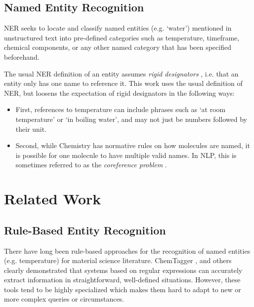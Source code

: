 \subsection{Named Entity Recognition}\label{sub:NER}
\gls{NER} seeks to locate and classify named entities (e.g. `water') mentioned in unstructured text into pre-defined categories \cite{li_survey_2022} such as temperature, timeframe, chemical components, or any other named category that has been specified beforehand.

The usual \gls{NER} definition of an entity assumes \textit{rigid designators} \cite{laporte_rigid_2022}, i.e. that an entity only has one name to reference it.
This work uses the usual definition of \gls{NER}, but loosens the expectation of rigid designators in the following ways:

\begin{itemize}
    \item First, references to temperature can include phrases such as `at room temperature' or `in boiling water', and may not just be numbers followed by their unit.
    \item Second, while Chemistry has normative rules on how molecules are named, it is possible for one molecule to have multiple valid names.
In \gls{NLP}, this is sometimes referred to as the \textit{coreference problem} \cite{hobbs_coherence_1979}.
\end{itemize}


\section{Related Work}

\subsection{Rule-Based Entity Recognition}\label{sub:rule-based}
There have long been rule-based approaches for the recognition of named entities (e.g. temperature) for material science literature.
ChemTagger \cite{hawizy_chemicaltagger_2011}, and others \cite{beard_comparative_2019, huang_database_2020}
clearly demonstrated that systems based on regular expressions can accurately extract information in straightforward, well-defined situations.
However, these tools tend to be highly specialized which makes them hard to adapt to new or more complex queries or circumstances.


